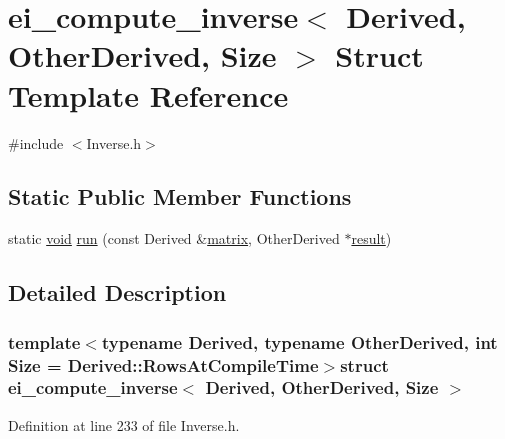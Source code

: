 \hypertarget{structei__compute__inverse}{\section{ei\-\_\-compute\-\_\-inverse$<$ Derived, Other\-Derived, Size $>$ Struct Template Reference}
\label{structei__compute__inverse}
}


{\ttfamily \#include $<$Inverse.\-h$>$}

\subsection*{Static Public Member Functions}
\begin{DoxyCompactItemize}
\item 
static \hyperlink{group___u_a_v_objects_plugin_ga444cf2ff3f0ecbe028adce838d373f5c}{void} \hyperlink{structei__compute__inverse_aaf0dcfd040ebf5f8a2244206854db3b6}{run} (const Derived \&\hyperlink{glext_8h_a7b24a3f2f56eb1244ae69dacb4fecb6f}{matrix}, Other\-Derived $\ast$\hyperlink{qxtslotjob_8h_aab161efab0511ea9612b64c40e9852ca}{result})
\end{DoxyCompactItemize}


\subsection{Detailed Description}
\subsubsection*{template$<$typename Derived, typename Other\-Derived, int Size = Derived\-::\-Rows\-At\-Compile\-Time$>$struct ei\-\_\-compute\-\_\-inverse$<$ Derived, Other\-Derived, Size $>$}



Definition at line 233 of file Inverse.\-h.



